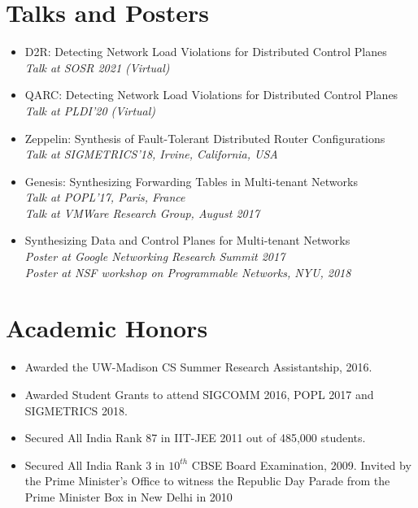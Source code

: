 \documentclass[11pt,a4paper,sans]{moderncv}        %
\begin{document}
\section{Talks and Posters}
\begin{itemize}
	\item D2R: Detecting Network Load Violations for Distributed Control Planes \\
	\emph{Talk at SOSR 2021 (Virtual)}

\item QARC: Detecting Network Load Violations for Distributed Control Planes \\
\emph{Talk at PLDI'20 (Virtual)}

\item Zeppelin: Synthesis of Fault-Tolerant Distributed Router Configurations \\
\emph{Talk at SIGMETRICS'18, Irvine, California, USA}

\item Genesis: Synthesizing Forwarding Tables in Multi-tenant Networks \\
\emph{Talk at POPL'17, Paris, France} \\
\emph{Talk at VMWare Research Group, August 2017}

\item Synthesizing Data and Control Planes for Multi-tenant Networks \\
\emph{Poster at Google Networking Research Summit 2017} \\
\emph{Poster at NSF workshop on Programmable Networks, NYU, 2018}
\end{itemize}
\section{Academic  Honors}
\begin{itemize}
\item{Awarded the UW-Madison CS Summer Research Assistantship, 2016.}
\item{Awarded Student Grants to attend SIGCOMM 2016, POPL 2017 and SIGMETRICS 2018.}
\item{Secured All India Rank 87 in IIT-JEE 2011 out of 485,000 students.}
\item{Secured All India Rank 3 in $10^{th}$ CBSE Board Examination, 2009. 
Invited by the Prime Minister's Office to witness the Republic Day 
Parade from the Prime Minister Box in New Delhi in 2010}
\end{itemize}

\end{document}
